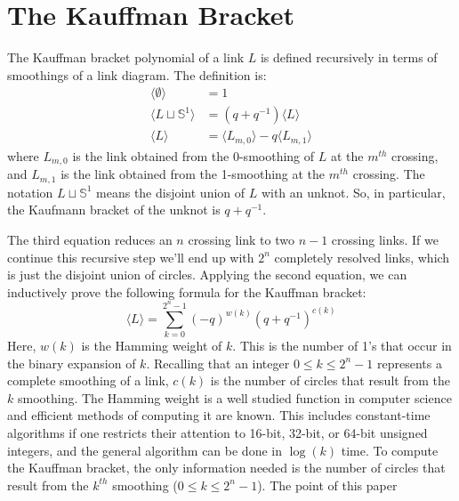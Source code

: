 \documentclass{article}
\theoremstyle{plain}
\begin{document}
    \section{The Kauffman Bracket}
        The Kauffman bracket polynomial of a link $L$ is defined recursively
        in terms of smoothings of a link diagram. The definition is:
        \begin{align}
            \langle\emptyset\rangle&=1\\
            \langle{L\sqcup\mathbb{S}^{1}}\rangle&=(q+q^{-1})\langle{L}\rangle\\
            \langle{L}\rangle&=
                \langle{L_{m,0}}\rangle-q\langle{L_{m,1}}\rangle
        \end{align}
        where $L_{m,0}$ is the link obtained from the 0-smoothing of $L$ at
        the $m^{th}$ crossing, and $L_{m,1}$ is the link obtained from the
        1-smoothing at the $m^{th}$ crossing. The notation
        $L\sqcup\mathbb{S}^{1}$ means the disjoint union of
        $L$ with an unknot. So, in particular, the Kaufmann bracket of the
        unknot is $q+q^{-1}$.
        \par\hfill\par
        The third equation reduces an $n$ crossing link to two $n-1$ crossing
        links. If we continue this recursive step we'll end up with
        $2^{n}$ completely resolved links, which is just the disjoint union of
        circles. Applying the second equation, we can inductively prove the
        following formula for the Kauffman bracket:
        \begin{equation}
            \langle{L}\rangle=\sum_{k=0}^{2^{n}-1}
                (-q)^{w(k)}(q+q^{-1})^{c(k)}
        \end{equation}
        Here, $w(k)$ is the Hamming weight of $k$. This is the number of 1's
        that occur in the binary expansion of $k$. Recalling that an integer
        $0\leq{k}\leq{2}^{n}-1$ represents a complete smoothing of a link,
        $c(k)$ is the number of circles that result from the $k$ smoothing.
        The Hamming weight is a well studied function in computer science and
        efficient methods of computing it are known. This includes
        constant-time algorithms if one restricts their attention to
        16-bit, 32-bit, or 64-bit unsigned integers, and the general algorithm
        can be done in $\log(k)$ time. To compute the Kauffman bracket, the
        only information needed is the number of circles that result from the
        $k^{th}$ smoothing ($0\leq{k}\leq{2}^{n}-1$). The point of this paper
\end{document}

